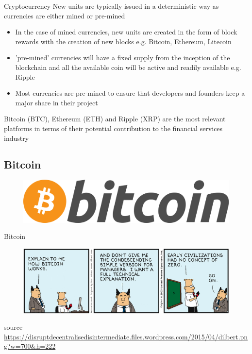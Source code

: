 \documentclass[10pt]{beamer}
\begin{document}
\begin{frame}{Cryptocurrency}
		New units are typically issued in a deterministic way as currencies are either mined or pre-mined
	\begin{itemize}
		\item In the case of mined currencies, new units are created in the form of block rewards with the creation of new blocks e.g. Bitcoin, Ethereum, Litecoin
		\item 'pre-mined' currencies will have a fixed supply from the inception of the blockchain and all the available coin will be active and readily available e.g. Ripple
		\item Most currencies are pre-mined to ensure that developers and founders keep a major share in their project
	\end{itemize}
	Bitcoin (BTC), Ethereum (ETH) and Ripple (XRP) are the most relevant platforms in terms of their potential contribution to the financial services industry
\end{frame}


\subsection{Bitcoin}

\begin{frame}
	\begin{figure}[]
		\centering
		\includegraphics  [scale=0.1]{Images/bitcoin-logo}
	\end{figure}
\end{frame}


\begin{frame}{Bitcoin}
	\begin{figure}[]
		\centering
		\includegraphics  [scale=0.5]{Images/dilbert-bitcoin}
	\end{figure}
	\begin{scriptsize}
		source \href{https://disruptdecentralisedisintermediate.files.wordpress.com/2015/04/dilbert.png?w=700&h=222}{https://disruptdecentralisedisintermediate.files.wordpress.com/2015/04/dilbert.png?w=700\&h=222}
	\end{scriptsize}

\end{frame}
\end{document}
